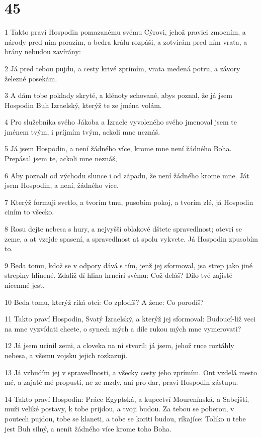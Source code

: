 \chapter{45}

\par 1 Takto praví Hospodin pomazanému svému Cýrovi, jehož pravici zmocním, a národy pred ním porazím, a bedra králu rozpáši, a zotvírám pred ním vrata, a brány nebudou zavírány:
\par 2 Já pred tebou pujdu, a cesty krivé zprímím, vrata medená potru, a závory železné posekám.
\par 3 A dám tobe poklady skryté, a klénoty schované, abys poznal, že já jsem Hospodin Buh Izraelský, kterýž te ze jména volám.
\par 4 Pro služebníka svého Jákoba a Izraele vyvoleného svého jmenoval jsem te jménem tvým, i príjmím tvým, ackoli mne neznáš.
\par 5 Já jsem Hospodin, a není žádného více, krome mne není žádného Boha. Prepásal jsem te, ackoli mne neznáš,
\par 6 Aby poznali od východu slunce i od západu, že není žádného krome mne. Ját jsem Hospodin, a není, žádného více.
\par 7 Kterýž formuji svetlo, a tvorím tmu, pusobím pokoj, a tvorím zlé, já Hospodin ciním to všecko.
\par 8 Rosu dejte nebesa s hury, a nejvyšší oblakové dštete spravedlnost; otevri se zeme, a at vzejde spasení, a spravedlnost at spolu vykvete. Já Hospodin zpusobím to.
\par 9 Beda tomu, kdož se v odpory dává s tím, jenž jej sformoval, jsa strep jako jiné strepiny hlinené. Zdaliž dí hlina hrncíri svému: Což deláš? Dílo tvé zajisté nicemné jest.
\par 10 Beda tomu, kterýž ríká otci: Co zplodíš? A žene: Co porodíš?
\par 11 Takto praví Hospodin, Svatý Izraelský, a kterýž jej sformoval: Budoucí-liž veci na mne vyzvídati chcete, o synech mých a díle rukou mých mne vymerovati?
\par 12 Já jsem ucinil zemi, a cloveka na ní stvoril; já jsem, jehož ruce roztáhly nebesa, a všemu vojsku jejich rozkazuji.
\par 13 Já vzbudím jej v spravedlnosti, a všecky cesty jeho zprímím. Ont vzdelá mesto mé, a zajaté mé propustí, ne ze mzdy, ani pro dar, praví Hospodin zástupu.
\par 14 Takto praví Hospodin: Práce Egyptská, a kupectví Mourenínská, a Sabejští, muži veliké postavy, k tobe prijdou, a tvoji budou. Za tebou se poberou, v poutech pujdou, tobe se klaneti, a tobe se koriti budou, ríkajíce: Toliko u tebe jest Buh silný, a nenít žádného více krome toho Boha.
